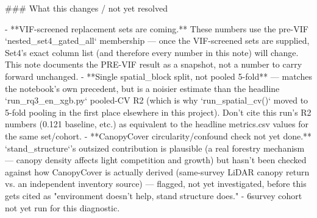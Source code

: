 ### What this changes / not yet resolved

- **VIF-screened replacement sets are coming.** These numbers use the pre-VIF `nested_set4_gated_all`
  membership — once the VIF-screened sets are supplied, Set4's exact column list (and therefore
  every number in this note) will change. This note documents the PRE-VIF result as a snapshot,
  not a number to carry forward unchanged.
- **Single spatial_block split, not pooled 5-fold** — matches the notebook's own precedent, but
  is a noisier estimate than the headline `run_rq3_en_xgb.py` pooled-CV R2 (which is why
  `run_spatial_cv()` moved to 5-fold pooling in the first place elsewhere in this project). Don't
  cite this run's R2 numbers (0.121 baseline, etc.) as equivalent to the headline metrics.csv
  values for the same set/cohort.
- **CanopyCover circularity/confound check not yet done.** `stand_structure`'s outsized
  contribution is plausible (a real forestry mechanism — canopy density affects light competition
  and growth) but hasn't been checked against how CanopyCover is actually derived (same-survey
  LiDAR canopy return vs. an independent inventory source) — flagged, not yet investigated,
  before this gets cited as "environment doesn't help, stand structure does."
- 6survey cohort not yet run for this diagnostic.
